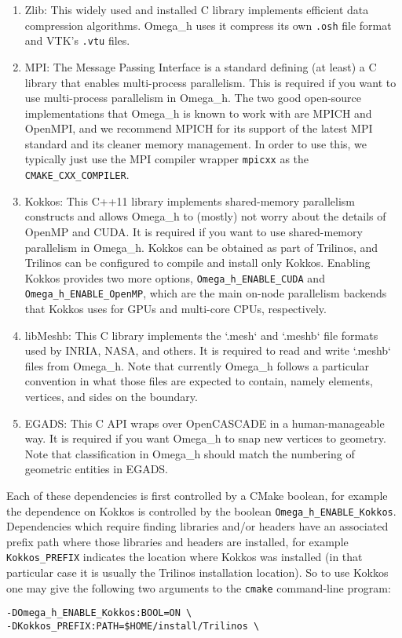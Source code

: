 \documentclass{article}
\begin{document}
\begin{enumerate}

\item Zlib: This widely used and installed C library implements
efficient data compression algorithms.
Omega\_h uses it compress its own \texttt{.osh} file format and
VTK's \texttt{.vtu} files.

\item MPI: The Message Passing Interface is a standard
defining (at least) a C library that enables multi-process parallelism.
This is required if you want to use multi-process parallelism
in Omega\_h.
The two good open-source implementations that Omega\_h is known
to work with are MPICH and OpenMPI, and we recommend
MPICH for its support of the latest MPI standard and its
cleaner memory management.
In order to use this, we typically just use the MPI compiler wrapper
\texttt{mpicxx} as the \texttt{CMAKE\_CXX\_COMPILER}.

\item Kokkos: This C++11 library implements shared-memory parallelism
constructs and allows Omega\_h to (mostly) not worry about the details
of OpenMP and CUDA.
It is required if you want to use shared-memory parallelism in Omega\_h.
Kokkos can be obtained as part of Trilinos, and Trilinos can be configured
to compile and install only Kokkos.
Enabling Kokkos provides two more options, \texttt{Omega\_h\_ENABLE\_CUDA}
and \texttt{Omega\_h\_ENABLE\_OpenMP}, which are the main on-node
parallelism backends that Kokkos uses for GPUs and multi-core CPUs,
respectively.

\item libMeshb: This C library implements the `.mesh` and `.meshb`
file formats used by INRIA, NASA, and others.
It is required to read and write `.meshb` files from Omega\_h.
Note that currently Omega\_h follows a particular convention in what
those files are expected to contain, namely elements, vertices,
and sides on the boundary.

\item EGADS: This C API wraps over OpenCASCADE in a human-manageable way.
It is required if you want Omega\_h to snap new vertices to geometry.
Note that classification in Omega\_h should match the numbering
of geometric entities in EGADS.

\end{enumerate}

Each of these dependencies is first controlled by a CMake boolean,
for example the dependence on Kokkos is controlled by the boolean
\texttt{Omega\_h\_ENABLE\_Kokkos}.
Dependencies which require finding libraries and/or headers have
an associated prefix path where those libraries and headers are installed,
for example \texttt{Kokkos\_PREFIX} indicates the location where
Kokkos was installed (in that particular case it is usually the
Trilinos installation location).
So to use Kokkos one may give the following two arguments to the
\texttt{cmake} command-line program:
\begin{lstlisting}
-DOmega_h_ENABLE_Kokkos:BOOL=ON \
-DKokkos_PREFIX:PATH=$HOME/install/Trilinos \
\end{lstlisting}
\end{document}
